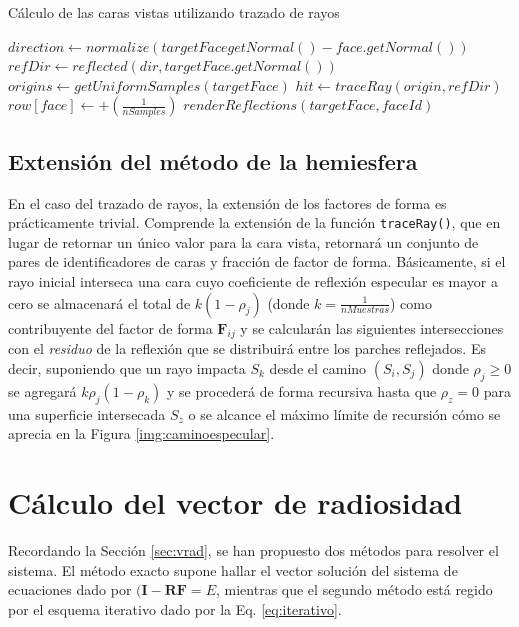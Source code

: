 \begin{algorithm}
	\caption{Cálculo de las caras vistas utilizando trazado de rayos}
	\label{alg:processHemicube}
	\begin{algorithmic}
			\State $direction \gets normalize(targetFacegetNormal() - face.getNormal())$
			\State $refDir \gets reflected(dir, targetFace.getNormal())$
			\State $origins \gets getUniformSamples(targetFace)$
				\State $hit \gets traceRay(origin, refDir)$
				\State $row[face] \gets +(\frac{1}{nSamples})$
						\State $renderReflections(targetFace, faceId)$
					\EndIf
				\EndIf
			\EndLoop
		\EndFunction
	\end{algorithmic}
\end{algorithm}

\subsection{Extensión del método de la hemiesfera}

En el caso del trazado de rayos, la extensión de los factores de forma es prácticamente trivial. Comprende la extensión de la función \verb|traceRay()|, que en lugar de retornar un único valor para la cara vista, retornará un conjunto de pares de identificadores de caras y fracción de factor de forma. Básicamente, si el rayo inicial interseca una cara cuyo coeficiente de reflexión especular es mayor a cero se almacenará el total de $k(1 - \rho_{j})$ (donde $k = \frac{1}{nMuestras}$) como contribuyente del factor de forma $\mathbf{F}_{ij}$ y se calcularán las siguientes intersecciones con el \textit{residuo} de la reflexión que se distribuirá entre los parches reflejados. Es decir, suponiendo que un rayo impacta $S_{k}$ desde el camino $(S_{i}, S_{j})$ donde $\rho_{j} \ge 0$ se agregará $k\rho_{j}(1 - \rho_{k})$ y se procederá de forma recursiva hasta que $\rho_{z} = 0$ para una superficie intersecada $S_{z}$ o se alcance el máximo límite de recursión cómo se aprecia en la Figura \ref{img:caminoespecular}.

\section{Cálculo del vector de radiosidad}

Recordando la Sección \ref{sec:vrad}, se han propuesto dos métodos para resolver el sistema. El método exacto supone hallar el vector solución del sistema de ecuaciones dado por $(\mathbf{I - RF} = E$, mientras que el segundo método está regido por el esquema iterativo dado por la Eq. \eqref{eq:iterativo}.

